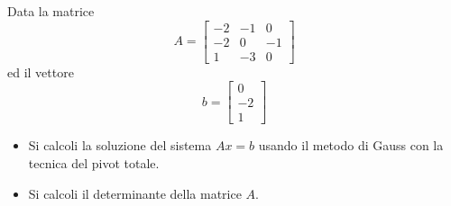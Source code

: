 Data la matrice
\bigskip
\[
A=\left[
\begin{array}{ccc}
-2 & -1 & 0 \\
-2 & 0 & -1\\
1 & -3 & 0
\end{array}\right]
\]
\noindent ed il vettore
\bigskip
\[
b=\left[
\begin{array}{ccc}
0\\
-2 \\
1
\end{array}\right]
\]
\begin{itemize}
\item Si calcoli la soluzione del sistema $Ax=b$ usando il metodo
di Gauss con la tecnica del pivot totale.
\item Si calcoli il determinante della matrice $A$.
\end{itemize}
